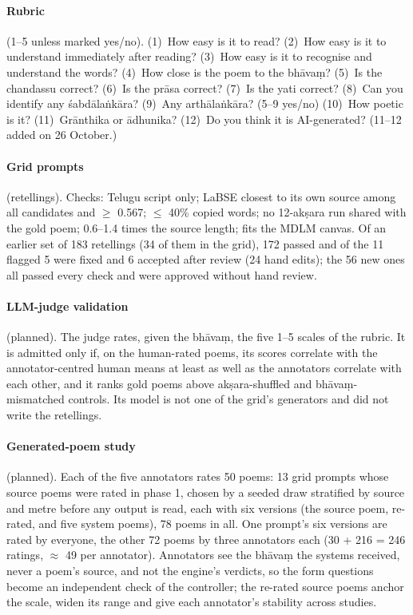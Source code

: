 \documentclass[11pt]{article}
\begin{document}
\paragraph{Rubric}\label{app:rubric} (1--5 unless marked yes/no). (1)~How easy is it to read? (2)~How easy is
it to understand immediately after reading? (3)~How easy is it to recognise and understand the words?
(4)~How close is the poem to the bhāvaṃ? (5)~Is the chandassu correct? (6)~Is the prāsa correct? (7)~Is the
yati correct? (8)~Can you identify any śabdālaṅkāra? (9)~Any arthālaṅkāra? (5--9 yes/no) (10)~How poetic is
it? (11)~Grānthika or ādhunika? (12)~Do you think it is AI-generated? (11--12 added on 26 October.)

\paragraph{Grid prompts}\label{app:prompts} (retellings). Checks: Telugu script only; LaBSE closest to its own
source among all candidates and $\geq$ 0.567; $\leq$ 40\% copied words; no 12-akṣara run shared with the gold
poem; 0.6--1.4 times the source length; fits the MDLM canvas. Of an earlier set of 183 retellings (34 of them
in the grid), 172 passed and of the 11 flagged 5 were fixed and 6 accepted after review (24 hand edits); the 56
new ones all passed every check and were approved without hand review.

\paragraph{LLM-judge validation}\label{app:judge} (planned). The judge rates, given the bhāvaṃ, the five 1--5
scales of the rubric. It is admitted only if, on the human-rated poems, its scores correlate with the
annotator-centred human means at least as well as the annotators correlate with each other, and it ranks gold
poems above akṣara-shuffled and bhāvaṃ-mismatched controls. Its model is not one of the grid's generators and
did not write the retellings.

\paragraph{Generated-poem study}\label{app:phase2} (planned). Each of the five annotators rates 50 poems: 13 grid
prompts whose source poems were rated in phase 1, chosen by a seeded draw stratified by source and metre before
any output is read, each with six versions (the source poem, re-rated, and five system poems), 78 poems in all.
One prompt's six versions are rated by everyone, the other 72 poems by three annotators each (30 + 216 = 246
ratings, $\approx$ 49 per annotator). Annotators see the bhāvaṃ the systems received, never a poem's source,
and not the engine's verdicts, so the form questions become an independent check of the controller; the
re-rated source poems anchor the scale, widen its range and give each annotator's stability across studies.
\end{document}
